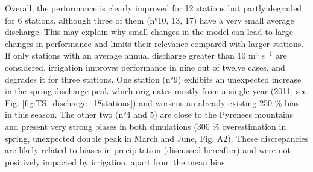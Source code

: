 Overall, the performance is clearly improved for 12 stations but partly degraded for 6 stations, although three of them (n°10, 13, 17) have a very small average discharge. This may explain why small changes in the model can lead to large changes in performance and limits their relevance compared with larger stations. If only stations with an average annual discharge greater than 10 m³ s$^{-1}$ are considered, irrigation improves performance in nine out of twelve cases, and degrades it for three stations. One station (n°9) exhibits an unexpected increase in the spring discharge peak which originates mostly from a single year (2011, see Fig. \ref{fig:TS_discharge_18stations}) and worsens an already-existing 250 \% bias in this season. The other two (n°4 and 5) are close to the Pyrenees mountains and present very strong biases in both simulations (300 \% overestimation in spring, unexpected double peak in March and June, Fig. A2). These discrepancies are likely related to biases in precipitation (discussed hereafter) and were not positively impacted by irrigation, apart from the mean bias.

